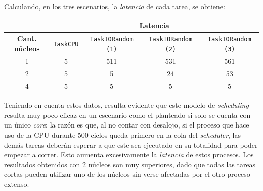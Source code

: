 Calculando, en los tres escenarios, la \emph{latencia} de cada tarea, se obtiene:

\begin{table}[H]
    \begin{center}
        \begin{tabular}{|c|c|c|c|c|}
            \hline
            & \multicolumn{4}{c|}{\textbf{Latencia}} \\ \hline
            \textbf{Cant. núcleos} & \texttt{TaskCPU} & \texttt{TaskIORandom (1)} & \texttt{TaskIORandom (2)} & \texttt{TaskIORandom (3)} \\ \hline
            1 & 5 & 511 & 531 & 561 \\
            2 & 5 & 5 & 24 & 53 \\
            4 & 5 & 5 & 5 & 5 \\ \hline
        \end{tabular}
    \end{center}
\end{table}

Teniendo en cuenta estos datos, resulta evidente que este modelo de
\emph{scheduling} resulta muy poco eficaz en un escenario como el planteado si
solo se cuenta con un único \emph{core}: la razón es que, al no contar con
desalojo, si el proceso que hace uso de la CPU durante 500 ciclos queda primero
en la cola del \emph{scheduler}, las demás tareas deberán esperar a que este
sea ejecutado en su totalidad para poder empezar a correr. Esto aumenta
excesivamente la \emph{latencia} de estos procesos. Los resultados obtenidos
con 2 núcleos son muy superiores, dado que todas las tareas cortas pueden
utilizar uno de los núcleos sin verse afectadas por el otro proceso extenso.
